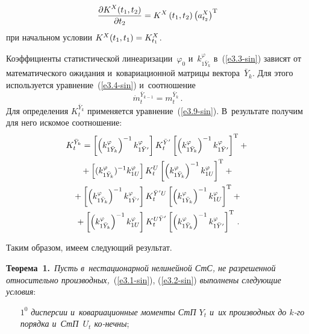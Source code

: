 \begin{multicols}{2}
 \vspace*{-8pt}
 
 \noindent
 \begin{equation}
\displaystyle\frac{\displaystyle \partial K^X (t_1, t_2)\mathstrut}{\displaystyle \partial t_2\mathstrut} = K^X \left(t_1,t_2\right) 
\left(a_{t_2}^X\right)^{\mathrm{T}}\label{e3.12-sin}
 \end{equation}
при начальном условии $K^X (t_1, t_1) \hm= K_{t_1}^X$.

Коэффициенты статистической линеаризации~$\varphi_0$ и~$k_{1\bar Y_k}^\varphi$  
в~(\ref{e3.3-sin}) зависят от математического ожидания и~ковариационной 
матрицы вектора~$\bar Y_k$. Для этого используется уравнение~(\ref{e3.4-sin}) 
и~соотношение
    \begin{equation}
    \dot m_t^{\bar Y_{k-1}} = m_t^{\bar Y_k}\,.\label{e3.13-sin}
    \end{equation}
Для определения $K_t^{\bar Y_k}$ применяется уравнение~(\ref{e3.9-sin}). 
В~результате получим для него искомое соотношение:
    \begin{multline}
    K_t^{\bar Y_k}  = \left[ \left(k_{1\bar Y_k}^\varphi \right)^{-1} 
    k_{1{\bar Y'}}^\varphi \right] 
    K_t^{\bar Y'} \left[ \left(k_{1\bar Y_k}^\varphi \right)^{-1} k_{1{\bar Y'}}^\varphi 
    \right]^{\mathrm{T}} +{}\\
{}+ \left[ (k_{1\bar Y_k}^\varphi )^{-1} k_{1U}^\varphi\right] K_t^U \left[ 
\left(k_{1\bar Y_k}^\varphi \right)^{-1} k_{1U}^\varphi\right]^{\mathrm{T}} +{}\\
{}+\left[ \left(k_{1\bar Y_k}^\varphi \right)^{-1} k_{1{\bar Y'}}^\varphi\right] 
K_t^{{\bar Y'} U} \left[ \left(k_{1\bar Y_k}^\varphi \right)^{-1}k_{1U}^\varphi 
\right]^{\mathrm{T}} +{}\\
{}+\left[ \left(k_{1\bar Y_k}^\varphi \right)^{-1}k_{1U}^\varphi\right] K_t^{U\bar Y'} 
\left[ \left(k_{1\bar Y_k}^\varphi \right)^{-1} k_{1{\bar Y'}}^\varphi\right]^{\mathrm{T}}\,.
\label{e3.14-sin}
\end{multline}

Таким образом, имеем следующий результат.

\smallskip

\noindent
\textbf{Теорема~1.}\ \textit{Пусть в~нестационарной нелинейной СтС, не разрешенной 
относительно производных,}~(\ref{e3.1-sin}), (\ref{e3.2-sin})
\textit{выполнены следующие условия}:
\begin{itemize}
\item[$1^0$] \textit{дисперсии и~ковариационные моменты СтП $Y_t$ и~их производных 
до $k$-го порядка и~СтП~$U_t$ ко-\linebreak нечны};


\end{itemize}
\end{multicols}
